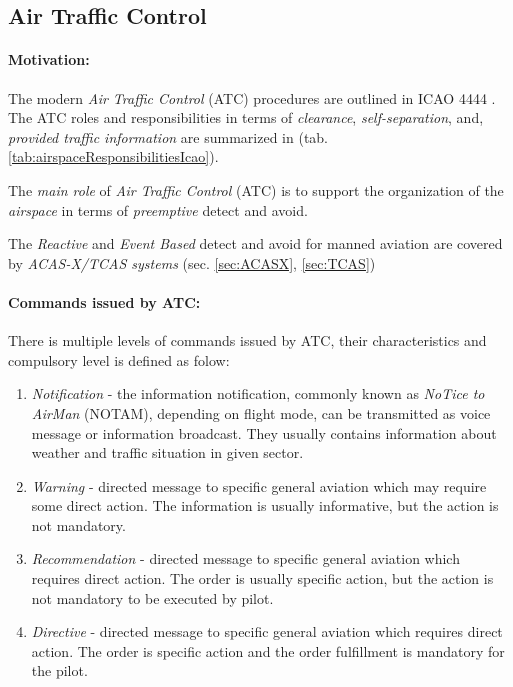 \subsection{Air Traffic Control}\label{sec:AirTrafficControl}
\paragraph{Motivation:} The modern \emph{Air Traffic Control} (ATC) procedures are outlined in ICAO 4444 \cite{icao4444}. The ATC roles and responsibilities in terms of \emph{clearance}, \emph{self-separation}, and, \emph{provided traffic information} are summarized in (tab. \ref{tab:airspaceResponsibilitiesIcao}). 

The \emph{main role} of \emph{Air Traffic Control} (ATC) is to support the organization of the \emph{airspace} in terms of \emph{preemptive} detect and avoid.

\begin{note}
    The \emph{Reactive} and \emph{Event Based} detect and avoid for manned aviation are covered by \emph{ACAS-X/TCAS systems} (sec. \ref{sec:ACASX}, \ref{sec:TCAS})
\end{note}

\paragraph{Commands issued by ATC:} There is multiple levels of commands issued by ATC, their characteristics and compulsory level is defined as folow:

\begin{enumerate}
    \item \emph{Notification} - the information notification, commonly known as \emph{NoTice to AirMan} (NOTAM), depending on flight mode, can be transmitted as voice message or information broadcast. They usually contains information about weather and traffic situation in given sector.
    
    \item \emph{Warning} - directed message to specific general aviation  which may require some direct action. The information is usually informative, but the action is not mandatory.
    
    \item \emph{Recommendation} - directed message to specific general aviation  which requires direct action. The order is usually specific action, but the action is not mandatory to be executed by pilot.
    
    \item \emph{Directive} - directed message to specific general aviation  which requires direct action. The order is specific action and the order fulfillment is mandatory for the pilot. 
\end{enumerate}

